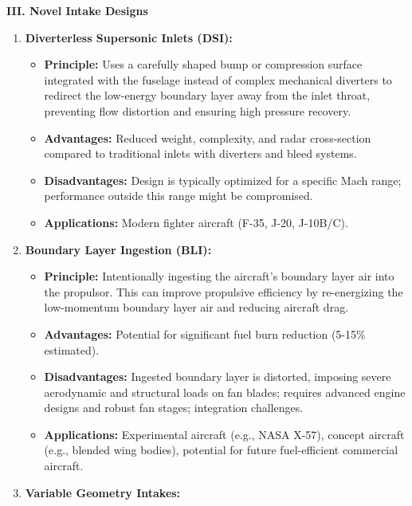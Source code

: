 \textbf{III. Novel Intake Designs}

\begin{enumerate}
\def\labelenumi{\arabic{enumi}.}
\tightlist
\item
  \textbf{Diverterless Supersonic Inlets (DSI):}

  \begin{itemize}
  \tightlist
  \item
    \textbf{Principle:} Uses a carefully shaped bump or compression
    surface integrated with the fuselage instead of complex mechanical
    diverters to redirect the low-energy boundary layer away from the
    inlet throat, preventing flow distortion and ensuring high pressure
    recovery.
  \item
    \textbf{Advantages:} Reduced weight, complexity, and radar
    cross-section compared to traditional inlets with diverters and
    bleed systems.
  \item
    \textbf{Disadvantages:} Design is typically optimized for a specific
    Mach range; performance outside this range might be compromised.
  \item
    \textbf{Applications:} Modern fighter aircraft (F-35, J-20,
    J-10B/C).
  \end{itemize}
\item
  \textbf{Boundary Layer Ingestion (BLI):}

  \begin{itemize}
  \tightlist
  \item
    \textbf{Principle:} Intentionally ingesting the aircraft's boundary
    layer air into the propulsor. This can improve propulsive efficiency
    by re-energizing the low-momentum boundary layer air and reducing
    aircraft drag.
  \item
    \textbf{Advantages:} Potential for significant fuel burn reduction
    (5-15\% estimated).
  \item
    \textbf{Disadvantages:} Ingested boundary layer is distorted,
    imposing severe aerodynamic and structural loads on fan blades;
    requires advanced engine designs and robust fan stages; integration
    challenges.
  \item
    \textbf{Applications:} Experimental aircraft (e.g., NASA X-57),
    concept aircraft (e.g., blended wing bodies), potential for future
    fuel-efficient commercial aircraft.
  \end{itemize}
\item
  \textbf{Variable Geometry Intakes:}


\end{enumerate}

